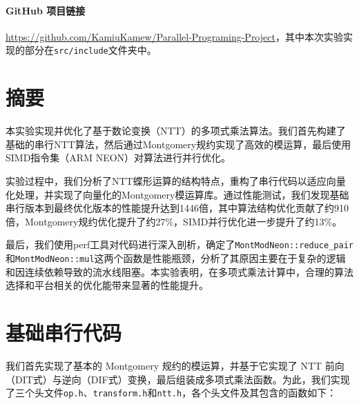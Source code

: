 \documentclass[a4paper]{article}
\begin{document}
\paragraph{GitHub 项目链接} \url{https://github.com/KamiuKamew/Parallel-Programing-Project}，其中本次实验实现的部分在\texttt{src/include}文件夹中。

\section{摘要}

本实验实现并优化了基于数论变换（NTT）的多项式乘法算法。我们首先构建了基础的串行NTT算法，然后通过Montgomery规约实现了高效的模运算，最后使用SIMD指令集（ARM NEON）对算法进行并行优化。

实验过程中，我们分析了NTT蝶形运算的结构特点，重构了串行代码以适应向量化处理，并实现了向量化的Montgomery模运算库。通过性能测试，我们发现基础串行版本到最终优化版本的性能提升达到1446倍，其中算法结构优化贡献了约910倍，Montgomery规约优化提升了约27\%，SIMD并行优化进一步提升了约13\%。

最后，我们使用perf工具对代码进行深入剖析，确定了\texttt{MontModNeon::reduce\_pair}和\texttt{MontModNeon::mul}这两个函数是性能瓶颈，分析了其原因主要在于复杂的逻辑和因连续依赖导致的流水线阻塞。本实验表明，在多项式乘法计算中，合理的算法选择和平台相关的优化能带来显著的性能提升。

\section{基础串行代码}

我们首先实现了基本的 Montgomery 规约的模运算，并基于它实现了 NTT 前向（DIT式）与逆向（DIF式）变换，最后组装成多项式乘法函数。为此，我们实现了三个头文件\texttt{op.h}、\texttt{transform.h}和\texttt{ntt.h}，各个头文件及其包含的函数如下：
\end{document}
